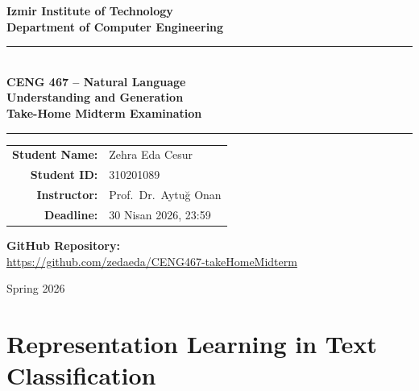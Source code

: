 \documentclass[12pt,a4paper]{article}
\newcommand{\studentid}{310201089}
\newcommand{\studentname}{Zehra Eda Cesur}
\begin{document}

\begin{titlepage}
    \begin{center}
    \vspace*{1cm}
    
    {\Large\bfseries Izmir Institute of Technology\\[0.3em]
    Department of Computer Engineering}
    
    \vspace{1.5cm}
    
    \noindent\rule{\linewidth}{1pt}\\[0.4cm]
    
    {\LARGE\bfseries\color{headerblue}
        CENG 467 – Natural Language\\[0.3em]
        Understanding and Generation\\[0.4cm]
        Take-Home Midterm Examination}\\[0.4cm]
        
    \noindent\rule{\linewidth}{1pt}
    
    \vspace{1.5cm}
    
    \begin{tabular}{rl}
        \textbf{Student Name:} & \studentname \\[0.4em]
        \textbf{Student ID:}   & \studentid   \\[0.4em]
        \textbf{Instructor:}   & Prof.\ Dr.\ Aytu\u{g} Onan \\[0.4em]
        \textbf{Deadline:}     & 30 Nisan 2026, 23:59 \\
    \end{tabular}
    
    \vspace{1.5cm}

    \textbf{GitHub Repository:}\\[0.3em]
    \url{https://github.com/zedaeda/CENG467-takeHomeMidterm}

    \vfill
    {\small Spring 2026}
    \end{center}
\end{titlepage}

\section{Representation Learning in Text Classification}
\end{document}
